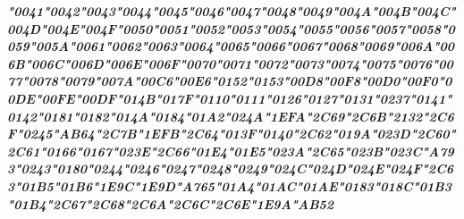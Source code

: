 {\LibertinusSerifPatch\itshape\bfseries 
	\char"0041\gs \char"0042\gs \char"0043\gs \char"0044\gs \char"0045\gs \char"0046\gs \char"0047\gs \char"0048\gs \char"0049\gs \char"004A\gs \char"004B\gs \char"004C\gs \char"004D\gs \char"004E\gs \char"004F\gs \char"0050\gs \char"0051\gs \char"0052\gs \char"0053\gs \char"0054\gs \char"0055\gs \char"0056\gs \char"0057\gs \char"0058\gs \char"0059\gs \char"005A\gs \char"0061\gs \char"0062\gs \char"0063\gs \char"0064\gs \char"0065\gs \char"0066\gs \char"0067\gs \char"0068\gs \char"0069\gs \char"006A\gs \char"006B\gs \char"006C\gs \char"006D\gs \char"006E\gs \char"006F\gs \char"0070\gs \char"0071\gs \char"0072\gs \char"0073\gs \char"0074\gs \char"0075\gs \char"0076\gs \char"0077\gs \char"0078\gs \char"0079\gs \char"007A\gs \char"00C6\gs \char"00E6\gs \char"0152\gs \char"0153\gs \char"00D8\gs \char"00F8\gs \char"00D0\gs \char"00F0\gs \char"00DE\gs \char"00FE\gs \char"00DF\gs \char"014B\gs \char"017F\gs \char"0110\gs \char"0111\gs \char"0126\gs \char"0127\gs \char"0131\gs \char"0237\gs \char"0141\gs \char"0142\gs \char"0181\gs \char"0182\gs \char"014A\gs \char"0184\gs \char"01A2\gs \char"024A\gs \char"1EFA\gs \char"2C69\gs \char"2C6B\gs \char"2132\gs \char"2C6F\gs \char"0245\gs \char"AB64\gs \char"2C7B\gs \char"1EFB\gs \char"2C64\gs \char"013F\gs \char"0140\gs \char"2C62\gs \char"019A\gs \char"023D\gs \char"2C60\gs \char"2C61\gs \char"0166\gs \char"0167\gs \char"023E\gs \char"2C66\gs \char"01E4\gs \char"01E5\gs \char"023A\gs \char"2C65\gs \char"023B\gs \char"023C\gs \char"A793\gs \char"0243\gs \char"0180\gs \char"0244\gs \char"0246\gs \char"0247\gs \char"0248\gs \char"0249\gs \char"024C\gs \char"024D\gs \char"024E\gs \char"024F\gs \char"2C63\gs \char"01B5\gs \char"01B6\gs \char"1E9C\gs \char"1E9D\gs \char"A765\gs \char"01A4\gs \char"01AC\gs \char"01AE\gs \char"0183\gs \char"018C\gs \char"01B3\gs \char"01B4\gs \char"2C67\gs \char"2C68\gs \char"2C6A\gs \char"2C6C\gs \char"2C6E\gs \char"1E9A\gs \char"AB52\gs
}
